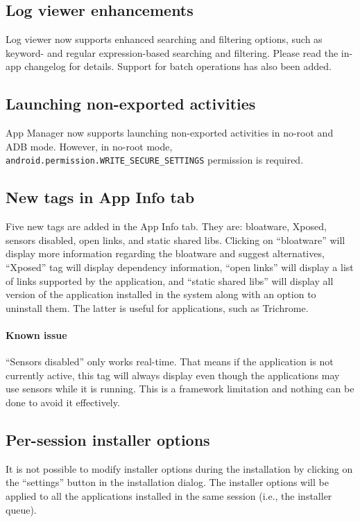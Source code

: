\subsection{Log viewer enhancements}
Log viewer now supports enhanced searching and filtering options, such as keyword- and regular
expression-based searching and filtering. Please read the in-app changelog for details. Support for
batch operations has also been added.

\subsection{Launching non-exported activities}
App Manager now supports launching non-exported activities in no-root and ADB mode. However, in
no-root mode, \texttt{android.permission.WRITE\_SECURE\_SETTINGS} permission is required.

\subsection{New tags in App Info tab}
Five new tags are added in the App Info tab. They are: bloatware, Xposed, sensors disabled, open
links, and static shared libs. Clicking on ``bloatware'' will display more information regarding
the bloatware and suggest alternatives, ``Xposed'' tag will display dependency information, ``open
links'' will display a list of links supported by the application, and ``static shared libs'' will
display all version of the application installed in the system along with an option to uninstall
them. The latter is useful for applications, such as Trichrome.

\paragraph{Known issue} ``Sensors disabled'' only works real-time. That means if the application is
not currently active, this tag will always display even though the applications may use sensors
while it is running. This is a framework limitation and nothing can be done to avoid it effectively.

\subsection{Per-session installer options}
It is not possible to modify installer options during the installation by clicking on the ``settings''
button in the installation dialog. The installer options will be applied to all the applications
installed in the same session (i.e., the installer queue).

